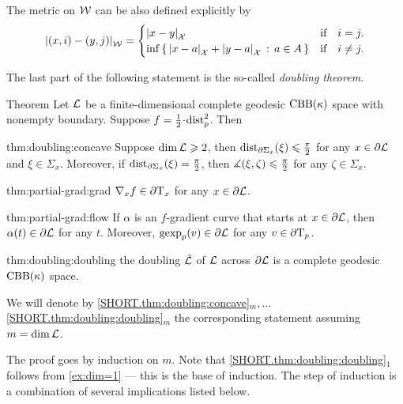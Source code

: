 The metric on $\mathcal{W}$ can be also defined explicitly by
\[\dist{(x,i)}{(y,j)}{\spc{W}}=
\begin{cases}
\dist{x}{y}{\spc{X}}&\text{if}\quad i= j.
\\
\inf\set{\dist{x}{a}{\spc{X}}+\dist{y}{a}{\spc{X}}}{a\in A}&\text{if}\quad i\ne j.
\end{cases}
\]

The last part of the following statement is the so-called \emph{doubling theorem}.

\begin{thm}{Theorem}\label{thm:doubling}
Let $\mathcal{L}$ be a finite-dimensional complete geodesic $\mathrm{CBB}(\kappa)$ space with nonempty boundary.
Suppose $f\z=\tfrac12\cdot\distfun_p^2$.
Then

\begin{subthm}{thm:doubling:concave}
Suppose $\operatorname{\rm dim}\nolimits \mathcal{L}\geqslant 2$, then
$\mathrm{dist}_{\partial \Sigma_x}(\xi)\leqslant \tfrac\pi2$ for any $x\in\partial \mathcal{L}$ and $\xi\in \Sigma_x$.
Moreover, if $\mathrm{dist}_{\partial \Sigma_x}(\xi)= \tfrac\pi2$, then $\measuredangle(\xi,\zeta)\leqslant\tfrac\pi2$ for any $\zeta\in \Sigma_x$. 
\end{subthm}

\begin{subthm}{thm:partial-grad:grad}
$\nabla_xf\in \partial\mathrm{T}_x$ for any $x\in\partial \mathcal{L}$.
\end{subthm}

\begin{subthm}{thm:partial-grad:flow}
If $\alpha$ is an $f$-gradient curve that starts at $x\in \partial \mathcal{L}$, then $\alpha(t)\in \partial \mathcal{L}$ for any $t$.
Moreover, $\operatorname{\rm gexp}\nolimits_p(v)\in \partial \mathcal{L}$ for any $v\in\partial\mathrm{T}_p$.
\end{subthm}

\begin{subthm}{thm:doubling:doubling}
the doubling $\hat{\mathcal{L}}$ of $\mathcal{L}$ across $\partial \mathcal{L}$ is a complete geodesic $\mathrm{CBB}(\kappa)$ space.
\end{subthm}

\end{thm}

We will denote by 
\ref{SHORT.thm:doubling:concave}$_m,\dots$\ref{SHORT.thm:doubling:doubling}$_m$ the corresponding statement assuming $m=\operatorname{\rm dim}\nolimits\mathcal{L}$.

The proof goes by induction on $m$.
Note that \ref{SHORT.thm:doubling:doubling}$_1$ follows from \ref{ex:dim=1} --- this is the base of induction.
The step of induction is a combination of several implications listed below.

